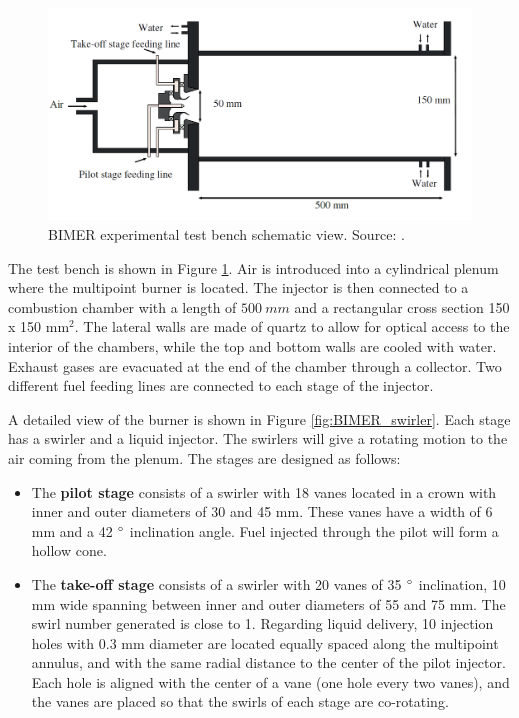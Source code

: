 \begin{figure}[h!]
	\centering
	\includegraphics[scale=0.4]{./part3_applications/figures_ch7_aero/BIMER_test_bench_expe_maquette}
	\caption{BIMER experimental test bench schematic view. Source: .}
	\label{fig:BIMER_test_bench_expe_maquette}
\end{figure}

The test bench is shown in Figure \ref{fig:BIMER_test_bench_expe_maquette}. Air is introduced into a cylindrical plenum where the multipoint burner is located. The injector is then connected to a combustion chamber with a length of $500 ~mm$ and a rectangular cross section 150 x 150 mm$^2$. The lateral walls are made of quartz to allow for optical access to the interior of the chambers, while the top and bottom walls are cooled with water. Exhaust gases are evacuated at the end of the chamber through a collector. Two different fuel feeding lines are connected to each stage of the injector. 

A detailed view of the burner is shown in Figure \ref{fig:BIMER_swirler}. Each stage has a swirler and a liquid injector. The swirlers will give a rotating motion to the air coming from the plenum. The stages are designed as follows:

\begin{itemize}

	\item The \textbf{pilot stage} consists of a swirler with 18 vanes located in a crown with inner and outer diameters of 30 and 45 mm. These vanes have a width of 6 mm and a 42 $\degree$ inclination angle. Fuel injected through the pilot will form a hollow cone.
	
	\item The \textbf{take-off stage} consists of a swirler with 20 vanes of 35 $\degree$ inclination, 10 mm wide spanning between inner and outer diameters of 55 and 75 mm. The swirl number generated is close to 1. Regarding liquid delivery, 10 injection holes with $0.3$ mm diameter are located equally spaced along the multipoint annulus, and with the same radial distance to the center of the pilot injector. Each hole is aligned with the center of a vane (one hole every two vanes), and the vanes are placed so that the swirls of each stage are co-rotating.

\end{itemize}

